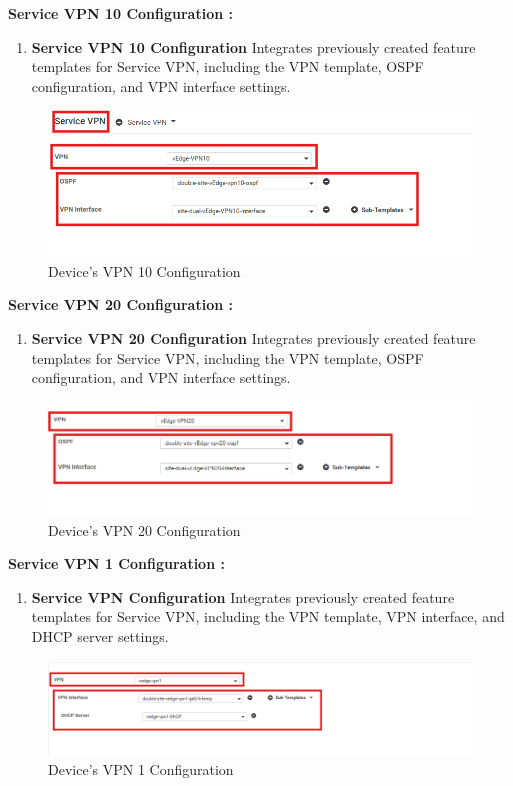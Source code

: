 \documentclass[12pt,english]{report}
\begin{document}
\textbf{Service VPN 10 Configuration :}
\begin{enumerate}
\item \textbf{Service VPN 10 Configuration}
Integrates previously created feature templates for Service VPN, including the VPN template, OSPF configuration, and VPN interface settings.
\end{enumerate}
\begin{figure}[H]
    \centering
    \includegraphics[width= 0.9 \textwidth]{chapitre 3/template/dt3.png}
    \caption{Device's VPN 10 Configuration}
    \label{Device's VPN 10 Configuration}
\end{figure} 
\textbf{Service VPN 20 Configuration :}
\begin{enumerate}
\item \textbf{Service VPN 20 Configuration}
Integrates previously created feature templates for Service VPN, including the VPN template, OSPF configuration, and VPN interface settings.
\end{enumerate}
\begin{figure}[H]
    \centering
    \includegraphics[width= 1 \textwidth]{chapitre 3/template/dt4.png}
    \caption{Device's VPN 20 Configuration}
    \label{Device's VPN 20 Configuration}
\end{figure}
\textbf{Service VPN 1 Configuration :}
\begin{enumerate}
\item \textbf{Service VPN Configuration}
Integrates previously created feature templates for Service VPN, including the VPN template, VPN interface, and DHCP server settings.
\end{enumerate}
\begin{figure}[H]
    \centering
    \includegraphics[width= 1 \textwidth]{chapitre 3/template/dt5.png}
    \caption{Device's VPN 1 Configuration}
    \label{Device's VPN 1 Configuration}
\end{figure}
\end{document}

